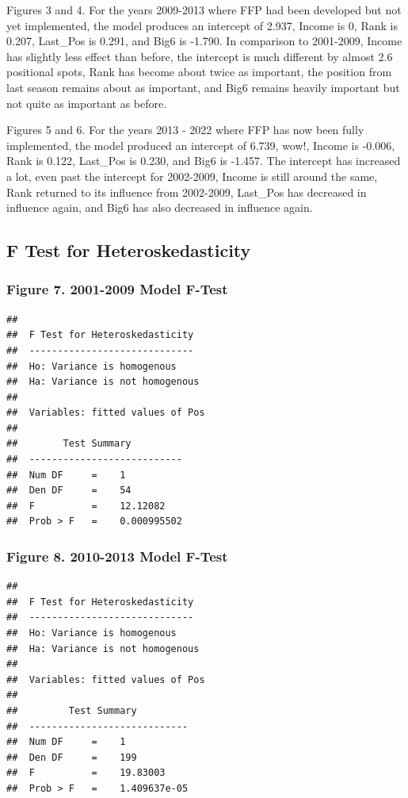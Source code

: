 \documentclass[
  12pt,
]{article}
\begin{document}
Figures 3 and 4. \textbar{} For the years 2009-2013 where FFP had been
developed but not yet implemented, the model produces an intercept of
2.937, Income is 0, Rank is 0.207, Last\_Pos is 0.291, and Big6 is
-1.790. In comparison to 2001-2009, Income has slightly less effect than
before, the intercept is much different by almost 2.6 positional spots,
Rank has become about twice as important, the position from last season
remains about as important, and Big6 remains heavily important but not
quite as important as before.

Figures 5 and 6. \textbar{} For the years 2013 - 2022 where FFP has now
been fully implemented, the model produced an intercept of 6.739, wow!,
Income is -0.006, Rank is 0.122, Last\_Pos is 0.230, and Big6 is -1.457.
The intercept has increased a lot, even past the intercept for
2002-2009, Income is still around the same, Rank returned to its
influence from 2002-2009, Last\_Pos has decreased in influence again,
and Big6 has also decreased in influence again.

\subsection{F Test for
Heteroskedasticity}\label{f-test-for-heteroskedasticity}

\subsubsection{Figure 7. 2001-2009 Model
F-Test}\label{figure-7.-2001-2009-model-f-test}

\begin{verbatim}
## 
##  F Test for Heteroskedasticity
##  -----------------------------
##  Ho: Variance is homogenous
##  Ha: Variance is not homogenous
## 
##  Variables: fitted values of Pos 
## 
##        Test Summary         
##  ---------------------------
##  Num DF     =    1 
##  Den DF     =    54 
##  F          =    12.12082 
##  Prob > F   =    0.000995502
\end{verbatim}

\subsubsection{Figure 8. 2010-2013 Model
F-Test}\label{figure-8.-2010-2013-model-f-test}

\begin{verbatim}
## 
##  F Test for Heteroskedasticity
##  -----------------------------
##  Ho: Variance is homogenous
##  Ha: Variance is not homogenous
## 
##  Variables: fitted values of Pos 
## 
##         Test Summary         
##  ----------------------------
##  Num DF     =    1 
##  Den DF     =    199 
##  F          =    19.83003 
##  Prob > F   =    1.409637e-05
\end{verbatim}
\end{document}
